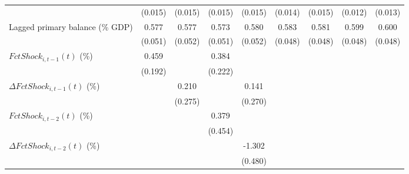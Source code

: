 {\begin{tabular}{l*{8}{c}}
                    &     (0.015)         &     (0.015)         &     (0.015)         &     (0.015)         &     (0.014)         &     (0.015)         &     (0.012)         &     (0.013)         \\
\addlinespace
Lagged primary balance (\% GDP)&       0.577\sym{***}&       0.577\sym{***}&       0.573\sym{***}&       0.580\sym{***}&       0.583\sym{***}&       0.581\sym{***}&       0.599\sym{***}&       0.600\sym{***}\\
                    &     (0.051)         &     (0.052)         &     (0.051)         &     (0.052)         &     (0.048)         &     (0.048)         &     (0.048)         &     (0.048)         \\
\addlinespace
$ FctShock_{i,t-1}(t)$ (\%)&       0.459\sym{**} &                     &       0.384\sym{*}  &                     &                     &                     &                     &                     \\
                    &     (0.192)         &                     &     (0.222)         &                     &                     &                     &                     &                     \\
\addlinespace
$ \Delta FctShock_{i,t-1}(t)$ (\%)&                     &       0.210         &                     &       0.141         &                     &                     &                     &                     \\
                    &                     &     (0.275)         &                     &     (0.270)         &                     &                     &                     &                     \\
\addlinespace
$ FctShock_{i,t-2}(t)$ (\%)&                     &                     &       0.379         &                     &                     &                     &                     &                     \\
                    &                     &                     &     (0.454)         &                     &                     &                     &                     &                     \\
\addlinespace
$ \Delta FctShock_{i,t-2}(t)$ (\%)&                     &                     &                     &      -1.302\sym{***}&                     &                     &                     &                     \\
                    &                     &                     &                     &     (0.480)         &                     &                     &                     &                     \\

\end{tabular}}
